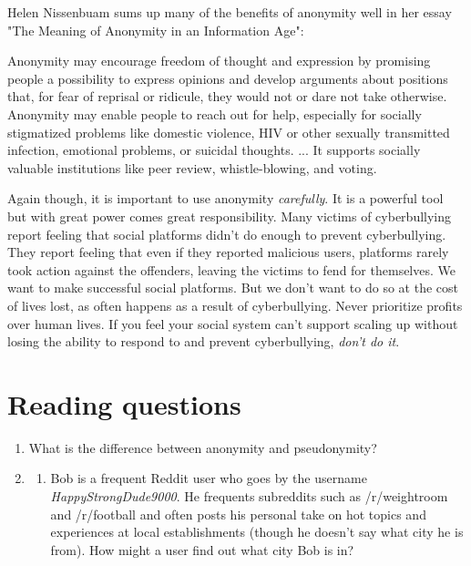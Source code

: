 \documentclass[class=book, crop=false]{standalone}
\begin{document}
Helen Nissenbuam sums up many of the benefits of anonymity well in her essay "The Meaning of Anonymity in an Information Age":
\begin{displayquote}
Anonymity may encourage freedom of thought and expression by promising people a possibility to express opinions and develop arguments about positions that, for fear of reprisal or ridicule, they would not or dare not take otherwise. Anonymity may enable people to reach out for help, especially for socially stigmatized problems like domestic violence, HIV or other sexually transmitted infection, emotional problems, or suicidal thoughts. ... It supports socially valuable institutions like peer review, whistle-blowing, and voting.
\end{displayquote}

Again though, it is important to use anonymity \textit{carefully}. It is a powerful tool but with great power comes great responsibility. Many victims of cyberbullying report feeling that social platforms didn't do enough to prevent cyberbullying. They report feeling that even if they reported malicious users, platforms rarely took action against the offenders, leaving the victims to fend for themselves. We want to make successful social platforms. But we don't want to do so at the cost of lives lost, as often happens as a result of cyberbullying. Never prioritize profits over human lives. If you feel your social system can't support scaling up without losing the ability to respond to and prevent cyberbullying, \textit{don't do it}.

\section{Reading questions}

\begin{enumerate}
    \item What is the difference between anonymity and pseudonymity?
    
    \item
    \begin{enumerate}
        \item Bob is a frequent Reddit user who goes by the username \textit{HappyStrongDude9000}. He frequents subreddits such as /r/weightroom and /r/football and often posts his personal take on hot topics and experiences at local establishments (though he doesn't say what city he is from). How might a user find out what city Bob is in?
    \end{enumerate}
\end{enumerate}
\end{document}
